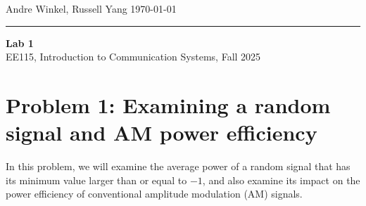 \documentclass[11pt]{article}
\begin{document}
\noindent Andre Winkel, Russell Yang \hfill \today \\
\rule{\textwidth}{0.4pt}

\begin{center} \large {\textbf{Lab 1}} \\[0em] 
{EE115, Introduction to Communication Systems, Fall 2025} \end{center}

\section{Problem 1: Examining a random signal and AM power efficiency}
In this problem, we will examine the average power of a random signal that has
its minimum value larger than or equal to $-1$, and also examine its impact on the power
efficiency of conventional amplitude modulation (AM) signals.
\end{document}
